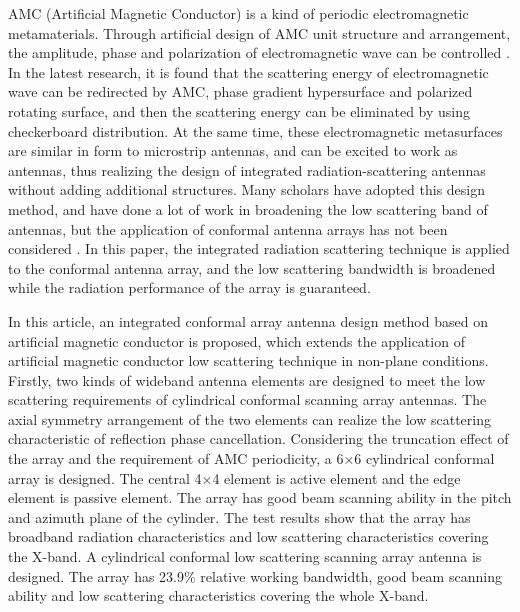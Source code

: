 \documentclass[USenglish]{article}
\theoremstyle{dgthm}
\theoremstyle{dgdef}
\begin{document}
AMC (Artificial Magnetic Conductor) is a kind of periodic electromagnetic metamaterials. Through artificial design of AMC unit structure and arrangement, the amplitude, phase and polarization of electromagnetic wave can be controlled \cite{p19,p20}. In the latest research, it is found that the scattering energy of electromagnetic wave can be redirected by AMC, phase gradient hypersurface and polarized rotating surface, and then the scattering energy can be eliminated by using checkerboard distribution. At the same time, these electromagnetic metasurfaces are similar in form to microstrip antennas, and can be excited to work as antennas, thus realizing the design of integrated radiation-scattering antennas without adding additional structures. Many scholars have adopted this design method, and have done a lot of work in broadening the low scattering band of antennas, but the application of conformal antenna arrays has not been considered \cite{p21,p22,p23,p24,p25}.  In this paper, the integrated radiation scattering technique is applied to the conformal antenna array, and the low scattering bandwidth is broadened while the radiation performance of the array is guaranteed.


In this article, an integrated conformal array antenna design method based on artificial magnetic conductor is proposed, which extends the application of artificial magnetic conductor low scattering technique in non-plane conditions. Firstly, two kinds of wideband antenna elements are designed to meet the low scattering requirements of cylindrical conformal scanning array antennas. The axial symmetry arrangement of the two elements can realize the low scattering characteristic of reflection phase cancellation. Considering the truncation effect of the array and the requirement of AMC periodicity, a 6$\times$6 cylindrical conformal array is designed. The central 4$\times$4 element is active element and the edge element is passive element. The array has good beam scanning ability in the pitch and azimuth plane of the cylinder. The test results show that the array has broadband radiation characteristics and low scattering characteristics covering the X-band. A cylindrical conformal low scattering scanning array antenna is designed. The array has 23.9\% relative working bandwidth, good beam scanning ability and low scattering characteristics covering the whole X-band.
\end{document}
